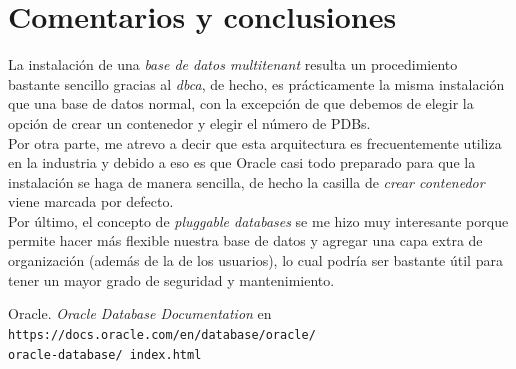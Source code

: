 \documentclass{article}
\begin{document}
\section*{Comentarios y conclusiones}

La instalación de una \textit{base de datos multitenant} resulta 
un procedimiento bastante sencillo gracias al \textit{dbca}, de hecho, es 
prácticamente la misma instalación que una base de datos normal, con la 
excepción de que debemos de elegir la opción de crear un contenedor y elegir 
el número de PDBs.\\

Por otra parte, me atrevo a decir que esta arquitectura es frecuentemente 
utiliza en la industria y debido a eso es que Oracle casi todo preparado
para que la instalación se haga de manera sencilla, de hecho la casilla de 
\textit{crear contenedor} viene marcada por defecto.\\

Por último, el concepto de \textit{pluggable databases} se me hizo muy 
interesante porque permite hacer más flexible nuestra base de datos y agregar 
una capa extra de organización (además de la de los usuarios), lo cual
podría ser bastante útil para tener un mayor grado de seguridad y mantenimiento.

\renewcommand\refname{Bibliografía}
\begin{thebibliography}{99}
     Oracle. \textit{Oracle Database Documentation} en 
        \texttt{https://docs.oracle.com/en/database/oracle/\\oracle-database/%
        index.html}
\end{thebibliography}
\end{document}
